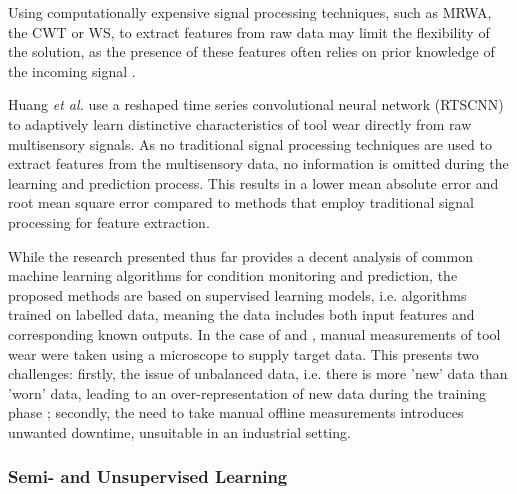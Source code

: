 \documentclass[../main.tex]{subfiles}
\begin{document}
Using computationally expensive signal processing techniques, such as MRWA, the CWT or WS, to extract features from raw data may limit the flexibility of the solution, as the presence of these features often relies on prior knowledge of the incoming signal \cite{RN24}.

Huang \textit{et al.} \cite{RN17} use a reshaped time series convolutional neural network (RTSCNN) to adaptively learn distinctive characteristics of tool wear directly from raw multisensory signals. As no traditional signal processing techniques are used to extract features from the multisensory data, no information is omitted during the learning and prediction process. This results in a lower mean absolute error and root mean square error compared to methods that employ traditional signal processing for feature extraction.

While the research presented thus far provides a decent analysis of common machine learning algorithms for condition monitoring and prediction, the proposed methods are based on supervised learning models, i.e. algorithms trained on labelled data, meaning the data includes both input features and corresponding known outputs. In the case of \cite{RN17} and \cite{RN13}, manual measurements of tool wear were taken using a microscope to supply target data. This presents two challenges: firstly, the issue of unbalanced data, i.e. there is more 'new' data than 'worn' data, leading to an over-representation of new data during the training phase \cite{RN6}; secondly, the need to take manual offline measurements introduces unwanted downtime, unsuitable in an industrial setting.


\subsubsection{Semi- and Unsupervised Learning}
\end{document}
